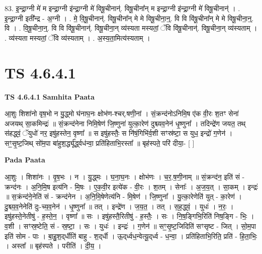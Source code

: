 \documentclass[17pt]{extarticle}
\begin{document}
83. इ॒न्द्रा॒ग्नी मे॑ म इन्द्रा॒ग्नी इ॑न्द्रा॒ग्नी मे॑ विषू॒चीनान्॑. विषू॒चीना᳚न् म इन्द्रा॒ग्नी इ॑न्द्रा॒ग्नी मे॑ विषू॒चीनान्॑ । . इ॒न्द्रा॒ग्नी इती᳚न्द्र - अ॒ग्नी । . मे॒ वि॒षू॒चीनान्॑. विषू॒चीना᳚न् मे मे विषू॒चीना॒न्॒. वि वि वि॑षू॒चीना᳚न् मे मे विषू॒चीना॒न्॒. वि । . वि॒षू॒चीना॒न्॒. वि वि वि॑षू॒चीनान्॑. विषू॒चीना॒न् व्य॑स्यता मस्यतां॒ ॅवि वि॑षू॒चीनान्॑. विषू॒चीना॒न् व्य॑स्यताम् । . व्य॑स्यता मस्यतां॒ ॅवि व्य॑स्यताम् । . अ॒स्य॒ता॒मित्य॑स्यताम् । \newline
\pagebreak
{}

\section{ TS 4.6.4.1 }

\textbf{TS 4.6.4.1 } \newline
\textbf{Samhita Paata} \newline

आ॒शुः शिशा॑नो वृष॒भो न यु॒द्ध्मो घ॑नाघ॒नः क्षोभ॑ण-श्चर्.षणी॒नां । सं॒क्रन्द॑नोऽनिमि॒ष ए॑क वी॒रः श॒तꣳ सेना॑ अजयथ् सा॒कमिन्द्रः॑ ॥ सं॒क्रन्द॑नेना निमि॒षेण॑ जि॒ष्णुना॑ युत्का॒रेण॑ दुश्च्यव॒नेन॑ धृ॒ष्णुना᳚ । तदिन्द्रे॑ण जयत॒ तथ् स॑हद्ध्वं॒ ॅयुधो॑ नर॒ इषु॑हस्तेन॒ वृष्णा᳚ ॥ स इषु॑हस्तैः॒ स नि॑षं॒गिभि॑र्व॒शी सꣳस्र॑ष्टा॒ स युध॒ इन्द्रो॑ ग॒णेन॑ । सꣳ॒॒सृ॒ष्ट॒जिथ् सो॑म॒पा बा॑हुश॒र्द्ध्यू᳚र्द्ध्वध॑न्वा॒ प्रति॑हिताभि॒रस्ता᳚ ॥ बृह॑स्पते॒ परि॑ दीया॒- [  ] \newline

\textbf{Pada Paata} \newline

आ॒शुः । शिशा॑नः । वृ॒ष॒भः । न । यु॒द्ध्मः । घ॒ना॒घ॒नः । क्षोभ॑णः । च॒र॒.ष॒णी॒नाम् ॥ सं॒क्रन्द॑न॒ इति॑ सं - क्रन्द॑नः । अ॒नि॒मि॒ष इत्य॑नि - मि॒षः । ए॒क॒वी॒र इत्ये॑क - वी॒रः । श॒तम् । सेनाः᳚ । अ॒ज॒य॒त् । सा॒कम् । इन्द्रः॑ ॥ स॒क्रंन्द॑ने॒नेति॑ सं - क्रन्द॑नेन । अ॒नि॒मि॒षेणेत्य॑नि - मि॒षेण॑ । जि॒ष्णुना᳚ । यु॒त्का॒रेणेति॑ युत् - का॒रेण॑ । दु॒श्च्य॒व॒नेनेति॑ दुः-च्य॒व॒नेन॑ । धृ॒ष्णुना᳚ ॥ तत् । इन्द्रे॑ण । ज॒य॒त॒ । तत् । स॒ह॒द्ध्वं॒ । युधः॑ । न॒रः॒ । इषु॑हस्ते॒नेतीषु॑ - ह॒स्ते॒न॒ । वृष्णा᳚ ॥ सः । इषु॑हस्तै॒रितीषु॑ - ह॒स्तैः॒ । सः । नि॒ष॒ङ्गिभि॒रिति॑ निष॒ङ्गि - भिः॒ । व॒शी । सꣳस्र॒ष्टेति॒ सं - स्र॒ष्टा॒ । सः । युधः॑ । इन्द्रः॑ । ग॒णेन॑ ॥ सꣳ॒॒सृ॒ष्ट॒जिदिति॑ सꣳसृष्ट - जित् । सो॒म॒पा इति॑ सोम - पाः । बा॒हु॒श॒द्‌र्धीति॑ बाहु - श॒द्‌र्धी । ऊ॒द्‌र्ध्वध॒न्वेत्यू॒द्‌र्ध्व - ध॒न्वा॒ । प्रति॑हिताभि॒रिति॒ प्रति॑ - हि॒ता॒भिः॒ । अस्ता᳚ ॥ बृह॑स्पते । परीति॑ । दी॒य॒ ।  \newline
\end{document}
